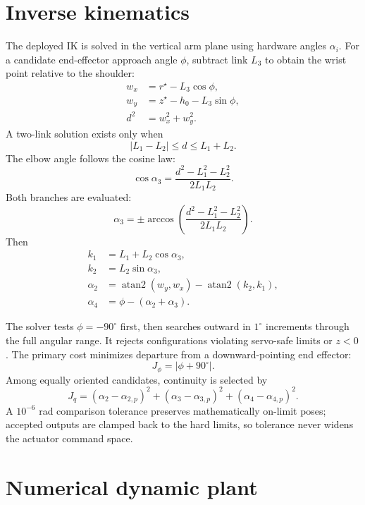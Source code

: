 \documentclass[11pt,a4paper]{article}
\begin{document}
\section{Inverse kinematics}
The deployed IK is solved in the vertical arm plane using hardware angles
$\alpha_i$. For a candidate end-effector approach angle $\phi$, subtract link
$L_3$ to obtain the wrist point relative to the shoulder:
\begin{align}
w_x &= r^{\star}-L_3\cos\phi,\\
w_y &= z^{\star}-h_0-L_3\sin\phi,\\
d^2 &= w_x^2+w_y^2.
\end{align}
A two-link solution exists only when
\[
|L_1-L_2|\leq d\leq L_1+L_2.
\]
The elbow angle follows the cosine law:
\begin{equation}
\cos\alpha_3=\frac{d^2-L_1^2-L_2^2}{2L_1L_2}.
\end{equation}
Both branches are evaluated:
\[
\alpha_3=\pm\arccos\left(
\frac{d^2-L_1^2-L_2^2}{2L_1L_2}\right).
\]
Then
\begin{align}
k_1&=L_1+L_2\cos\alpha_3,\\
k_2&=L_2\sin\alpha_3,\\
\alpha_2&=\operatorname{atan2}(w_y,w_x)-\operatorname{atan2}(k_2,k_1),\\
\alpha_4&=\phi-(\alpha_2+\alpha_3).
\end{align}

The solver tests $\phi=-90^\circ$ first, then searches outward in $1^\circ$
increments through the full angular range. It rejects configurations violating
servo-safe limits or $z<0$. The primary cost minimizes departure from a
downward-pointing end effector:
\[
J_{\phi}=|\phi+90^\circ|.
\]
Among equally oriented candidates, continuity is selected by
\[
J_q=(\alpha_2-\alpha_{2,p})^2+(
\alpha_3-\alpha_{3,p})^2+(
\alpha_4-\alpha_{4,p})^2.
\]
A $10^{-6}$ rad comparison tolerance preserves mathematically on-limit poses;
accepted outputs are clamped back to the hard limits, so tolerance never widens
the actuator command space.

\section{Numerical dynamic plant}\label{sec:plant}
\end{document}
